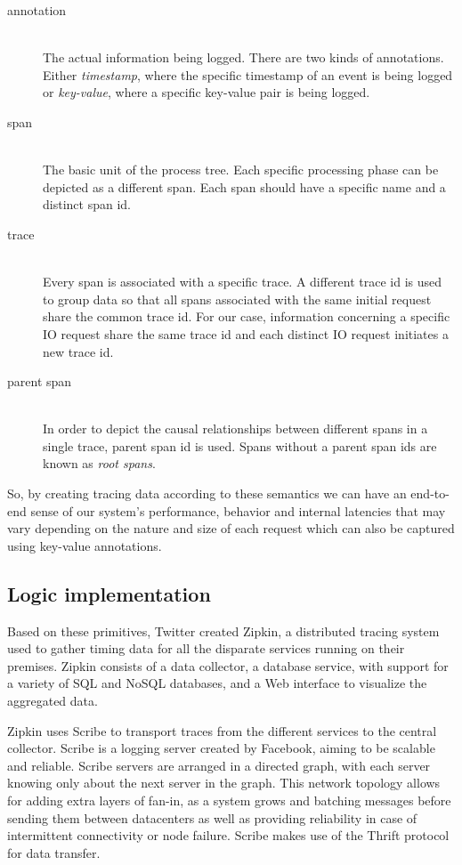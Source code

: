 \documentclass[11pt,journal,compsoc]{IEEEtran}
\begin{document}
\begin{description}
\item[annotation] \hfill \\
The actual information being logged. There are two kinds of annotations. Either
\emph{timestamp}, where the specific timestamp of an event is being logged or
\emph{key-value}, where a specific key-value pair is being logged.
\item[span] \hfill \\
The basic unit of the process tree. Each specific processing phase can be
depicted as a different span. Each span should have a specific name and a
distinct span id.
\item[trace] \hfill \\
Every span is associated with a specific trace. A different trace id is used to
group data so that all spans associated with the same initial request share the
common trace id. For our case, information concerning a specific IO request
share the same trace id and each distinct IO request initiates a new trace id.
\item[parent span] \hfill \\
In order to depict the causal relationships between different spans in a single
trace, parent span id is used. Spans without a parent span ids are  known as
\emph{root spans}.
\end{description}

So, by creating tracing data according to these semantics we can have an
end-to-end sense of our system's performance, behavior and internal latencies
that may vary depending on the nature and size of each request which can also
be captured using key-value annotations.

\subsection{Logic implementation} Based on these primitives, Twitter created
Zipkin, a distributed tracing system used to gather timing data for all the
disparate services running on their premises. Zipkin consists of a data
collector, a database service, with support for a variety of SQL and NoSQL
databases, and a Web interface to visualize the aggregated data.

Zipkin uses Scribe\cite{scribe} to transport traces from the different services
to the central collector. Scribe is a logging server created by Facebook,
aiming to be scalable and reliable. Scribe servers are arranged in a directed
graph, with each server knowing only about the next server in the graph. This
network topology allows for adding extra layers of fan-in, as a system grows
and batching messages before sending them between datacenters as well as
providing reliability in case of intermittent connectivity or node failure.
Scribe makes use of the Thrift protocol\cite{thrift} for data transfer.
\end{document}
